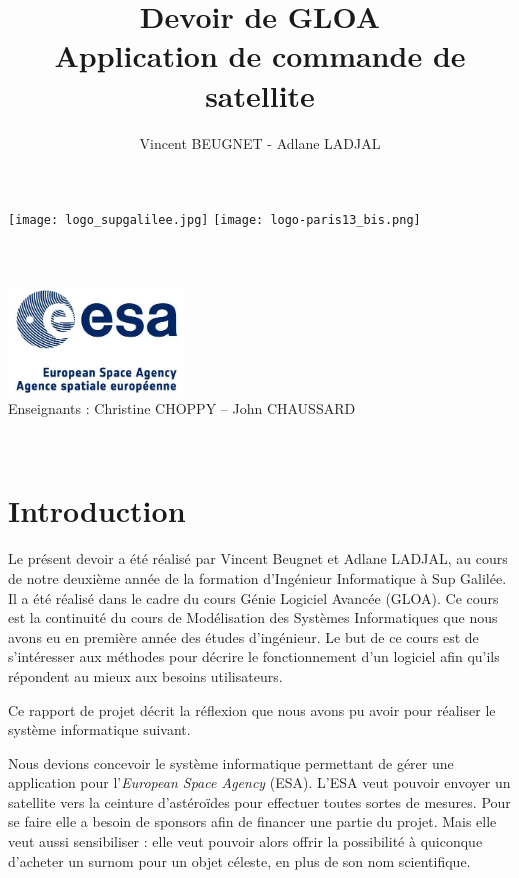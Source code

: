 \documentclass[11pt,a4paper]{article}
\author{Vincent BEUGNET - Adlane LADJAL}
\title{Devoir de GLOA \\ Application de commande de satellite}
\begin{document}
\makeatletter
\begin{titlepage}
    \centering
    \texttt{[image: logo\_supgalilee.jpg]}
    \hfill
    \texttt{[image: logo-paris13\_bis.png]} \\
    \vspace{5cm}
       {\LARGE \textbf{\@title}} \\
    \vspace{2em}
        {\large \@author }\\
    \vspace{1em}
        {\textit{\@date}} \\
    \vspace{2em}
            \includegraphics[width=0.35\textwidth]{logo-esa.jpg}\\
        \vspace{2em}
            {Enseignants : Christine CHOPPY -- John CHAUSSARD} \\
    \vfill
\end{titlepage}


\newpage
~
\newpage

\renewcommand{\contentsname}{Sommaire}
\tableofcontents

\newpage

\pagestyle{empty}

\section{Introduction}
Le présent devoir a été réalisé par Vincent Beugnet 
et Adlane LADJAL, au cours de notre deuxième année 
de la  formation d'Ingénieur Informatique à 
Sup Galilée. Il a été réalisé dans le cadre du cours 
Génie Logiciel Avancée (GLOA). Ce cours est la continuité
du cours de Modélisation des Systèmes Informatiques
que nous avons eu en première année des études d'ingénieur.
Le but de ce cours est de s'intéresser aux méthodes pour
décrire le fonctionnement d'un logiciel afin qu'ils répondent
au mieux aux besoins utilisateurs.

Ce rapport de projet décrit la réflexion que nous avons pu 
avoir pour réaliser le système informatique suivant.

Nous devions concevoir le système informatique permettant
de gérer une application pour l’\textit{European Space Agency}
(ESA). L’ESA veut pouvoir envoyer un satellite vers la ceinture
d'astéro\"ides pour effectuer toutes sortes de mesures.
Pour se faire elle a besoin de sponsors afin de financer une
partie du projet. Mais elle veut aussi sensibiliser : elle veut
pouvoir alors offrir la possibilité à quiconque d'acheter un
surnom pour un objet céleste, en plus de son nom scientifique.
\end{document}
